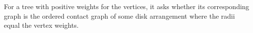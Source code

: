 \begin{prob}\label{problem:OrderedTree}
For a tree with positive weights for the vertices, it asks whether its corresponding graph is the 
ordered contact graph of some disk arrangement where the radii equal the vertex weights.
\end{prob}








